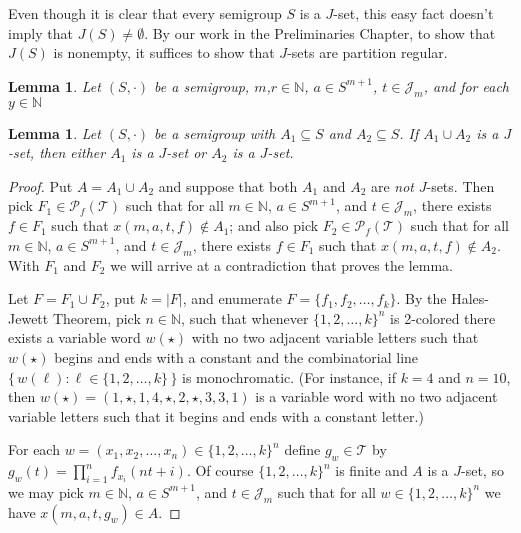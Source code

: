 \documentclass[12pt]{article}
\theoremstyle{plain}
\newtheorem{lem}[thm]{Lemma}
\theoremstyle{definition}
\newcommand{\bbN}{\mathbb{N}}
\newcommand{\calJ}{\mathcal{J}}
\newcommand{\calT}{\mathcal{T}}
\newcommand{\Pf}{\mathcal{P}_f}
\begin{document}
Even though it is clear that every semigroup $S$ is a $J$-set, this easy fact doesn't imply that $J(S) \ne \emptyset$. 
By our work in the Preliminaries Chapter, to show that $J(S)$ is nonempty, it suffices to show that $J$-sets are partition regular.

\begin{lem}
  Let $(S, \cdot)$ be a semigroup, $m$,$r \in \bbN$, $a \in S^{m+1}$, $t \in \calJ_m$, and for each $y \in \bbN$ 

\end{lem}

\begin{lem}
  Let $(S, \cdot)$ be a semigroup with $A_1 \subseteq S$ and $A_2 \subseteq S$.
  If $A_1 \cup A_2$ is a $J$-set, then either $A_1$ is a $J$-set or $A_2$ is a $J$-set.
\end{lem}
\begin{proof}
  Put $A = A_1 \cup A_2$ and suppose that both $A_1$ and $A_2$ are \textsl{not} $J$-sets. 
  Then pick $F_1 \in \Pf(\calT)$ such that for all $m \in \bbN$, $a \in S^{m+1}$, and $t \in \calJ_m$, there exists $f \in F_1$ such that $x(m, a, t, f) \not\in A_1$; and also pick $F_2 \in \Pf(\calT)$ such that for all $m \in \bbN$, $a \in S^{m+1}$, and $t \in \calJ_m$, there exists $f \in F_1$ such that $x(m, a, t, f) \not\in A_2$.
  With $F_1$ and $F_2$ we will arrive at a contradiction that proves the lemma.

  Let $F = F_1 \cup F_2$, put $k = |F|$, and enumerate $F = \{f_1, f_2, \ldots, f_k\}$.
  By the Hales-Jewett Theorem, pick $n \in \bbN$, such that whenever $\{1, 2, \ldots, k\}^n$ is 2-colored there exists a variable word $w(\star)$ with no two adjacent variable letters such that $w(\star)$ begins and ends with a constant and the combinatorial line $\bigl\{\, w(\ell) : \ell \in \{1, 2, \ldots, k\} \,\bigr\}$ is monochromatic. 
  (For instance, if $k = 4$ and $n = 10$, then $w(\star) = (1, \star, 1, 4, \star, 2, \star, 3, 3, 1)$ is a variable word with no two adjacent variable letters such that it begins and ends with a constant letter.)
  
  For each $w = (x_1, x_2, \ldots, x_n) \in \{1, 2, \ldots, k\}^n$ define $g_w \in \calT$ by $g_w(t) = \prod_{i=1}^n f_{x_i}(nt + i)$.
  Of course $\{1, 2, \ldots, k\}^n$ is finite and $A$ is a $J$-set, so we may pick $m \in \bbN$, $a \in S^{m+1}$, and $t \in \calJ_m$ such that for all $w \in \{1, 2, \ldots, k\}^n$ we have $x(m, a, t, g_w) \in A$.


\end{proof}
\end{document}
